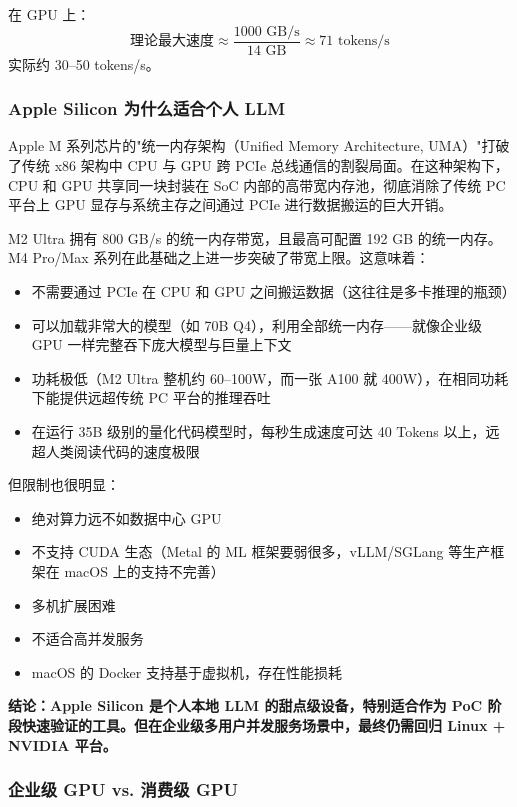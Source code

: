\documentclass[UTF8,a4paper,10pt,oneside]{ctexart}
\begin{document}
在 GPU 上：
\[
\text{理论最大速度} \approx \frac{1000\text{ GB/s}}{14\text{ GB}} \approx 71\text{ tokens/s}
\]
实际约 30--50 tokens/s。

\subsubsection{Apple Silicon 为什么适合个人 LLM}

Apple M 系列芯片的"统一内存架构（Unified Memory Architecture, UMA）"打破了传统 x86 架构中 CPU 与 GPU 跨 PCIe 总线通信的割裂局面。在这种架构下，CPU 和 GPU 共享同一块封装在 SoC 内部的高带宽内存池，彻底消除了传统 PC 平台上 GPU 显存与系统主存之间通过 PCIe 进行数据搬运的巨大开销。

M2 Ultra 拥有 800 GB/s 的统一内存带宽，且最高可配置 192 GB 的统一内存。M4 Pro/Max 系列在此基础之上进一步突破了带宽上限。这意味着：
\begin{itemize}
    \item 不需要通过 PCIe 在 CPU 和 GPU 之间搬运数据（这往往是多卡推理的瓶颈）
    \item 可以加载非常大的模型（如 70B Q4），利用全部统一内存——就像企业级 GPU 一样完整吞下庞大模型与巨量上下文
    \item 功耗极低（M2 Ultra 整机约 60--100W，而一张 A100 就 400W），在相同功耗下能提供远超传统 PC 平台的推理吞吐
    \item 在运行 35B 级别的量化代码模型时，每秒生成速度可达 40 Tokens 以上，远超人类阅读代码的速度极限
\end{itemize}

但限制也很明显：
\begin{itemize}
    \item 绝对算力远不如数据中心 GPU
    \item 不支持 CUDA 生态（Metal 的 ML 框架要弱很多，vLLM/SGLang 等生产框架在 macOS 上的支持不完善）
    \item 多机扩展困难
    \item 不适合高并发服务
    \item macOS 的 Docker 支持基于虚拟机，存在性能损耗
\end{itemize}

\textbf{结论：Apple Silicon 是个人本地 LLM 的甜点级设备，特别适合作为 PoC 阶段快速验证的工具。但在企业级多用户并发服务场景中，最终仍需回归 Linux + NVIDIA 平台。}

\subsubsection{企业级 GPU vs. 消费级 GPU}
\end{document}
